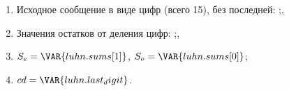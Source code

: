 \begin{enumerate}
\item Исходное сообщение в виде цифр (всего 15), без последней:
;,

\item Значения остатков от деления цифр:
;,

\item $S_e = \VAR{luhn.sums[1]}$, $S_o = \VAR{luhn.sums[0]}$;
\item $cd = \VAR{luhn.last_digit}$.
\end{enumerate}